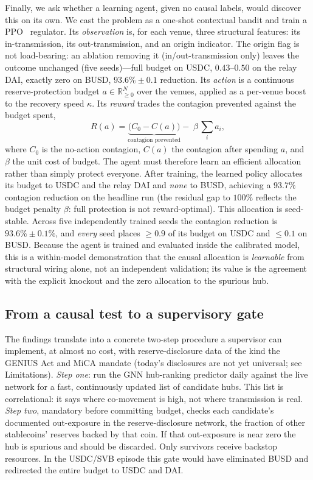 \documentclass[sigconf,anonymous]{acmart}
\begin{document}
Finally, we ask whether a learning agent, given no causal labels, would discover this on its own. We
cast the problem as a one-shot contextual bandit and train a PPO~\cite{schulman2017ppo} regulator.
Its \emph{observation} is, for each venue, three structural features: its in-transmission, its
out-transmission, and an origin indicator. The origin flag is not load-bearing: an ablation
removing it (in/out-transmission only) leaves the outcome unchanged (five seeds)---full budget
on USDC, $0.43$--$0.50$ on the relay DAI, exactly zero on BUSD, $93.6\%\pm0.1$ reduction. Its \emph{action} is a continuous reserve-protection budget $a\in\mathbb{R}^N_{\ge 0}$
over the venues, applied as a per-venue boost to the recovery speed $\kappa$. Its \emph{reward}
trades the contagion prevented against the budget spent,
\begin{equation}
R(a)=\underbrace{\big(C_0-C(a)\big)}_{\text{contagion prevented}}-\;\beta\,\textstyle\sum_i a_i,
\end{equation}
where $C_0$ is the no-action contagion, $C(a)$ the contagion after spending $a$, and $\beta$ the unit
cost of budget. The agent must therefore learn an efficient allocation rather than simply protect
everyone. After training, the learned policy allocates
its budget to USDC and the relay DAI and \emph{none} to BUSD, achieving a $93.7\%$ contagion reduction
on the headline run (the residual gap to $100\%$ reflects the budget penalty $\beta$: full protection
is not reward-optimal). This allocation is seed-stable. Across five independently trained seeds the
contagion reduction is $93.6\%\pm0.1\%$, and \emph{every} seed places $\ge0.9$ of its budget on
USDC and $\le0.1$ on BUSD. Because the agent is trained and evaluated inside the calibrated
model, this is a within-model demonstration that the causal allocation is \emph{learnable} from
structural wiring alone, not an independent validation; its value is the agreement with the
explicit knockout and the zero allocation to the spurious hub.


\subsection{From a causal test to a supervisory gate}

The findings translate into a concrete two-step procedure a supervisor can implement, at almost
no cost, with reserve-disclosure data of the kind the GENIUS Act and MiCA mandate (today's
disclosures are not yet universal; see Limitations). \emph{Step one}: run the
GNN hub-ranking predictor daily against the live network for a fast, continuously updated list of
candidate hubs. This list is correlational: it says where co-movement is high, not where
transmission is real. \emph{Step two}, mandatory before committing budget, checks each candidate's
documented out-exposure in the reserve-disclosure network, the fraction of other stablecoins'
reserves backed by that coin. If that out-exposure is near zero the hub is spurious and should be
discarded. Only survivors receive backstop resources. In the USDC/SVB episode this gate would have
eliminated BUSD and redirected the entire budget to USDC and DAI.
\end{document}
